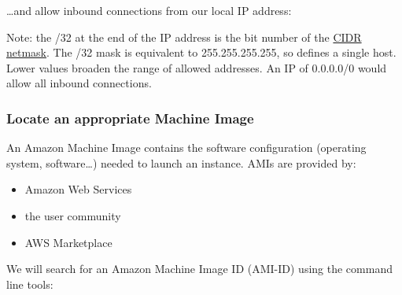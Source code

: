 \ldots{}and allow inbound connections from our local IP address:

\begin{Shaded}
\begin{Highlighting}[]
\NormalTok{$ } 
    \NormalTok{\textbackslash{}}
   \KeywordTok{<}\KeywordTok{>}\NormalTok{/32 \textbackslash{}}
   \NormalTok{22 \textbackslash{}}
   
\end{Highlighting}
\end{Shaded}

Note: the /32 at the end of the IP address is the bit number of the
\href{http://en.wikipedia.org/wiki/Classless_Inter-Domain_Routing}{CIDR
netmask}. The /32 mask is equivalent to 255.255.255.255, so defines a
single host. Lower values broaden the range of allowed addresses. An IP
of 0.0.0.0/0 would allow all inbound connections.

\subsubsection{Locate an appropriate Machine
Image}\label{locate-an-appropriate-machine-image}

An Amazon Machine Image contains the software configuration (operating
system, software\ldots{}) needed to launch an instance. AMIs are
provided by:

\begin{itemize}
\itemsep1pt\parskip0pt
\item
  Amazon Web Services
\item
  the user community
\item
  AWS Marketplace
\end{itemize}

We will search for an Amazon Machine Image ID (AMI-ID) using the command
line tools:

\begin{Shaded}
\begin{Highlighting}[]
\NormalTok{$ } 
   
\end{Highlighting}
\end{Shaded}

